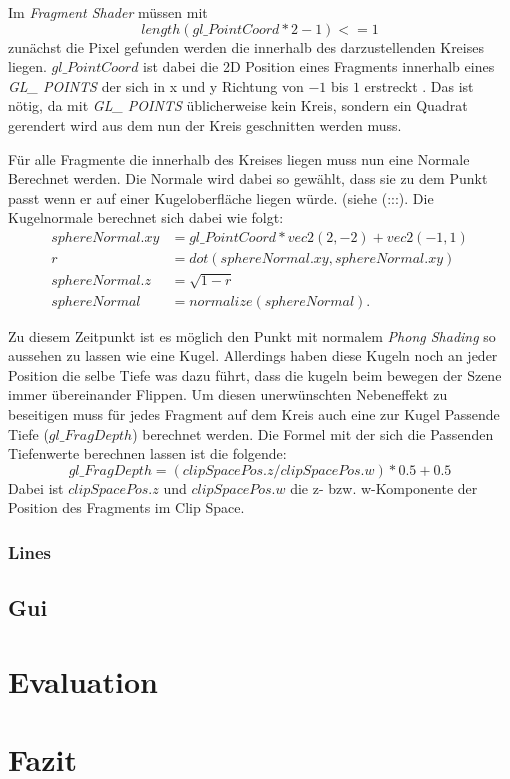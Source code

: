 \documentclass[a4paper,m]{cgBA}
\begin{document}
Im \textit{Fragment Shader} müssen mit 
\begin{equation}
length(gl\_ PointCoord * 2 - 1) <= 1
\end{equation}
zunächst die Pixel gefunden werden die innerhalb des darzustellenden Kreises liegen. \(gl\_ PointCoord\) ist dabei die 2D Position eines Fragments innerhalb eines \textit{GL\_ POINTS} der sich in x und y Richtung von \(-1\) bis \(1\) erstreckt . Das ist nötig, da mit \textit{GL\_ POINTS} üblicherweise kein Kreis, sondern ein Quadrat gerendert wird aus dem nun der Kreis geschnitten werden muss.

Für alle Fragmente die innerhalb des Kreises liegen muss nun eine Normale Berechnet werden. Die Normale wird dabei so gewählt, dass sie zu dem Punkt passt wenn er auf einer Kugeloberfläche liegen würde. (siehe (:::). Die Kugelnormale berechnet sich dabei wie folgt:
\begin{equation}
\begin{split}
sphereNormal.xy & = gl\_ PointCoord * vec2(2,-2) + vec2(-1, 1)\\
r & = dot(sphereNormal.xy, sphereNormal.xy)\\
sphereNormal.z & = \sqrt{1 - r}\\
sphereNormal & = normalize(sphereNormal).
\end{split}
\end{equation}

Zu diesem Zeitpunkt ist es möglich den Punkt mit normalem \textit{Phong Shading} so aussehen zu lassen wie eine Kugel. Allerdings haben diese Kugeln noch an jeder Position die selbe Tiefe was dazu führt, dass die kugeln beim bewegen der Szene immer übereinander Flippen. Um diesen unerwünschten Nebeneffekt zu beseitigen muss für jedes Fragment auf dem Kreis auch eine zur Kugel Passende Tiefe (\(gl\_ FragDepth\)) berechnet werden. Die Formel mit der sich die Passenden Tiefenwerte berechnen lassen ist die folgende:
\begin{equation}
gl\_ FragDepth = (clipSpacePos.z / clipSpacePos.w) * 0.5 + 0.5
\end{equation}
Dabei ist \(clipSpacePos.z\) und \(clipSpacePos.w\) die z- bzw. w-Komponente der Position des Fragments im Clip Space.
\subsubsection{Lines}

\subsection{Gui}

\section{Evaluation}

\section{Fazit}



\end{document}
